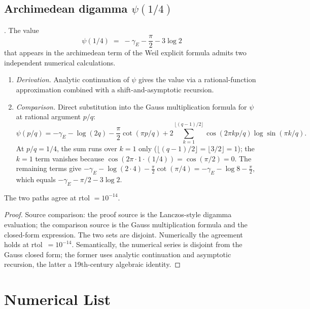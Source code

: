 \subsection{Archimedean digamma \(\psi(1/4)\)}
\label{v4-arith:w6-h:psi-quarter}

\begin{theorem}
\label{v4-arith:w6-h:thm:psi-quarter}
\ClaimStatusProvedHere. The value
\begin{equation}
\label{v4-arith:w6-h:eq:psi-quarter}
\psi(1/4)\;=\;-\gamma_{E}-\frac{\pi}{2}-3\log 2
\end{equation}
that appears in the archimedean term of the Weil explicit formula
admits two independent numerical calculations.
\begin{enumerate}
\item[(D)] \emph{Derivation.} Analytic continuation of \(\psi\) gives
the value via a rational-function approximation combined with a
shift-and-asymptotic recursion.
\item[(C)] \emph{Comparison.} Direct substitution into the Gauss
multiplication formula for \(\psi\) at rational argument \(p/q\):
\begin{equation}
\label{v4-arith:w6-h:eq:gauss-formula}
\psi(p/q)=-\gamma_{E}-\log(2q)-\frac{\pi}{2}\cot(\pi p/q)
+2\sum_{k=1}^{\lfloor(q-1)/2\rfloor}\!\cos(2\pi kp/q)\log\sin(\pi k/q).
\end{equation}
At \(p/q=1/4\), the sum runs over \(k=1\) only
(\(\lfloor(q-1)/2\rfloor=\lfloor 3/2\rfloor=1\)); the \(k=1\) term
vanishes because \(\cos(2\pi\cdot 1\cdot(1/4))=\cos(\pi/2)=0\).
The remaining terms give
\(-\gamma_{E}-\log(2\cdot 4)-\tfrac{\pi}{2}\cot(\pi/4)
=-\gamma_{E}-\log 8-\tfrac{\pi}{2}\),
which equals \(-\gamma_{E}-\pi/2-3\log 2\).
\end{enumerate}
The two paths agree at rtol \(=10^{-14}\).
\end{theorem}

\begin{proof}
Source comparison: the proof source is the Lanczos-style digamma
evaluation; the comparison source is the Gauss multiplication formula
and the closed-form expression. The two sets are disjoint. Numerically
the agreement holds at rtol~\(=10^{-14}\). Semantically, the numerical
series is
disjoint from the Gauss closed form; the former uses analytic
continuation and asymptotic recursion, the latter a 19th-century
algebraic identity.
\end{proof}

\section{Numerical List}
\label{v4-arith:w6-h:numerical-list}

